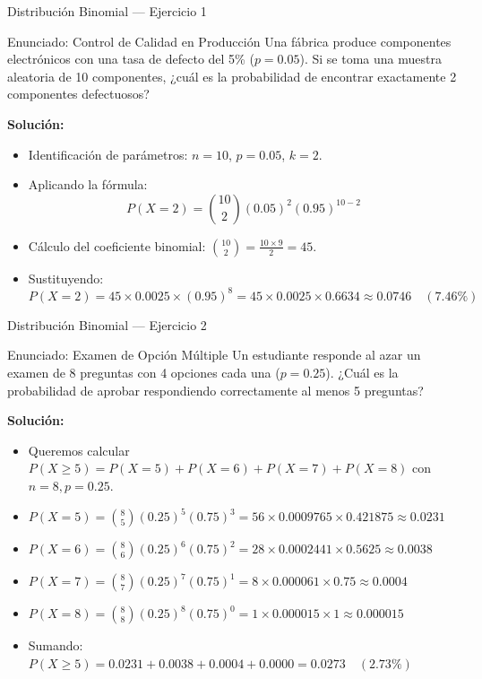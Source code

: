 \documentclass[aspectratio=169, 10pt]{beamer}
\begin{document}
\begin{frame}{Distribución Binomial — Ejercicio 1}
    \begin{exampleblock}{Enunciado: Control de Calidad en Producción}
        Una fábrica produce componentes electrónicos con una tasa de defecto del 5\% ($p=0.05$). Si se toma una muestra aleatoria de 10 componentes, ¿cuál es la probabilidad de encontrar exactamente 2 componentes defectuosos?
    \end{exampleblock}
    
    \textbf{Solución:}
    \begin{itemize}
        \item Identificación de parámetros: $n = 10$, $p = 0.05$, $k = 2$.
        \item Aplicando la fórmula:
        $$P(X = 2) = \binom{10}{2} (0.05)^2 (0.95)^{10-2}$$
        \item Cálculo del coeficiente binomial: $\binom{10}{2} = \frac{10 \times 9}{2} = 45$.
        \item Sustituyendo:
        $$P(X = 2) = 45 \times 0.0025 \times (0.95)^8 = 45 \times 0.0025 \times 0.6634 \approx \mathbf{0.0746} \quad (7.46\%)$$
    \end{itemize}
\end{frame}

\begin{frame}{Distribución Binomial — Ejercicio 2}
    \begin{exampleblock}{Enunciado: Examen de Opción Múltiple}
        Un estudiante responde al azar un examen de 8 preguntas con 4 opciones cada una ($p = 0.25$). ¿Cuál es la probabilidad de aprobar respondiendo correctamente al menos 5 preguntas?
    \end{exampleblock}
    \pause
    \textbf{Solución:}
    \begin{itemize}
        \item Queremos calcular $P(X \ge 5) = P(X=5) + P(X=6) + P(X=7) + P(X=8)$ con $n=8, p=0.25$.
        \item $P(X=5) = \binom{8}{5} (0.25)^5 (0.75)^3 = 56 \times 0.0009765 \times 0.421875 \approx 0.0231$
        \item $P(X=6) = \binom{8}{6} (0.25)^6 (0.75)^2 = 28 \times 0.0002441 \times 0.5625 \approx 0.0038$
        \item $P(X=7) = \binom{8}{7} (0.25)^7 (0.75)^1 = 8 \times 0.000061 \times 0.75 \approx 0.0004$
        \item $P(X=8) = \binom{8}{8} (0.25)^8 (0.75)^0 = 1 \times 0.000015 \times 1 \approx 0.000015$
        \item Sumando: $P(X \ge 5) = 0.0231 + 0.0038 + 0.0004 + 0.0000 = \mathbf{0.0273} \quad (2.73\%)$
    \end{itemize}
\end{frame}
\end{document}
